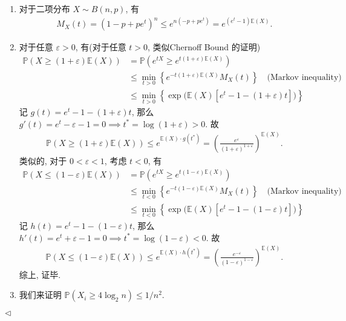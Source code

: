 \documentclass[11pt]{article}
\newenvironment{answer}[1][Solution]{\begin{trivlist}
    \item[\hskip \labelsep {\bfseries #1.}\hskip \labelsep]}{\hfill$\lhd$\end{trivlist}}
\newcommand\1{\mathds{1}}
\newcommand\E{\mathbb{E}}
\newcommand\PP{\mathbb{P}}
\begin{document}
\begin{answer}
    \begin{enumerate}[label=(\arabic*)]
        \item 对于二项分布 $X\sim B(n,p)$, 有
        \begin{align*}
            M_X(t) = \left(1-p+pe^t\right)^n \le e^{n(-p+pe^t)} = e^{(e^t-1)\E(X)}.
        \end{align*}
        \item 对于任意 $\varepsilon > 0$, 有(对于任意 $t > 0$, 类似Chernoff Bound 的证明)
        \begin{align*}
            \PP(X\ge (1+\varepsilon)\E(X)) &= \PP(e^{tX} \ge e^{t(1+\varepsilon)\E(X)}) \\
            &\le \min_{t>0} \left\{e^{-t(1+\varepsilon)\E(X)} M_X(t)\right\} \quad \text{(Markov inequality)}\\
            &\le \min_{t>0} \left\{\exp\bigg(\E(X)[e^t - 1 - (1+\varepsilon)t]\bigg)\right\} 
        \end{align*}
        记 $g(t) = e^t - 1 - (1+\varepsilon)t$, 那么 $g'(t) = e^t - \varepsilon - 1 = 0 \implies t^* = \log(1+\varepsilon) > 0$. 故
        \begin{align*}
            \PP(X\ge (1+\varepsilon)\E(X)) \le e^{\E(X)\cdot g(t^*)} =  \left(\frac{e^{\varepsilon}}{(1+\varepsilon)^{1+\varepsilon}}\right)^{\E(X)}.
        \end{align*}
        类似的, 对于 $0 < \varepsilon < 1$, 考虑 $t < 0$, 有
        \begin{align*}
            \PP(X\le (1-\varepsilon)\E(X)) &= \PP(e^{tX} \ge e^{t(1-\varepsilon)\E(X)}) \\
            &\le \min_{t<0} \left\{e^{-t(1-\varepsilon)\E(X)} M_X(t)\right\} \quad \text{(Markov inequality)}\\
            &\le \min_{t<0} \left\{\exp\bigg(\E(X)[e^t - 1 - (1-\varepsilon)t]\bigg)\right\}
        \end{align*}
        记 $h(t) = e^t - 1 - (1-\varepsilon)t$, 那么 $h'(t) = e^t + \varepsilon - 1 = 0 \implies t^* = \log(1-\varepsilon) < 0$. 故
        \begin{align*}
            \PP(X\le (1-\varepsilon)\E(X)) \le e^{\E(X)\cdot h(t^*)} =  \left(\frac{e^{-\varepsilon}}{(1-\varepsilon)^{1-\varepsilon}}\right)^{\E(X)}.
        \end{align*}
        综上, 证毕.
        \item 我们来证明 $\PP(X_i \ge 4\log_2 n) \le 1/n^2$. 
        

\end{enumerate}
\end{answer}
\end{document}
